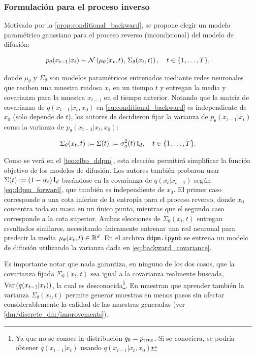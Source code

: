 \subsubsection{Formulación para el proceso inverso}

Motivado por la \autoref{prop:conditional_backward}, se propone elegir un modelo paramétrico gaussiano para el proceso reverso (incondicional) del modelo de difusión:

\begin{equation}
    \label{eq:backward_transition}
    p_\theta(x_{t-1}|x_t)\sim\mathcal{N}\left(\mu_\theta(x_t,t),\,\Sigma_\theta(x_t,t)\right),
    \quad t\in\{1,\ldots,T\},
\end{equation}

donde $\mu_\theta$ y $\Sigma_\theta$ son modelos paramétricos entrenados mediante redes neuronales que reciben una muestra ruidosa $x_t$ en un tiempo $t$ y entregan la media y covarianza para la muestra $x_{t-1}$ en el tiempo anterior. Notando que la matriz de covarianza de $q(x_{t-1}|x_t,x_0)$ en \eqref{eq:conditional_backward} es independiente de $x_0$ (solo depende de $t$), los autores de \cite{ho2020denoising} decidieron fijar la varianza de $p_\theta(x_{t-1}|x_t)$ como la varianza de $p_\theta(x_{t-1}|x_t,x_0)$:

\begin{equation}
    \label{eq:backward_covariance}
    \Sigma_\theta(x_t,t):=\Sigma(t):=\sigma_q^2(t)\operatorname{I}_{d},
    \quad t\in\{1,\ldots,T\}.
\end{equation}

Como se verá en el \autoref{teo:elbo_ddpm}, esta elección permitirá simplificar la función objetivo de los modelos de difusión. Los autores también probaron usar $\Sigma(t):=(1-\alpha_{t})\operatorname{I}_{d}$ basándose en la covarianza de $q(x_{t}|x_{t-1})$ según \eqref{eq:ddpm_forward}, que también es independiente de $x_0$. El primer caso corresponde a una cota inferior de la entropía para el proceso reverso, donde $x_0$ concentra toda su masa en un único punto, mientras que el segundo caso corresponde a la cota superior. Ambas elecciones de $\Sigma_\theta(x_t,t)$ entregan resultados similares, necesitando únicamente entrenar una red neuronal para predecir la media $\mu_\theta(x_t,t)\in\mathbb{R}^d$. En el archivo \texttt{ddpm.ipynb} se entrena un modelo de difusión utilizando la varianza dada en \eqref{eq:backward_covariance}.

Es importante notar que nada garantiza, en ninguno de los dos casos, que la covarianza fijada $\Sigma_\theta(x_t,t)$ sea igual a la covarianza realmente buscada, $\operatorname{Var}\left(q(x_{t-1}|x_t)\right)$, la cual es desconocida\footnote{Ya que no se conoce la distribución $q_0=p_{\operatorname{true}}$. Si se conociera, se podría obtener $q(x_{t-1}|x_t)$ usando $q(x_{t-1}|x_t,x_0)$}. En \cite{nichol2021improved} muestran que aprender también la varianza $\Sigma_\theta(x_t,t)$ permite generar muestras en menos pasos sin afectar considerablemente la calidad de las muestras generadas (ver \autoref{dm/discrete_dm/improvements}).

